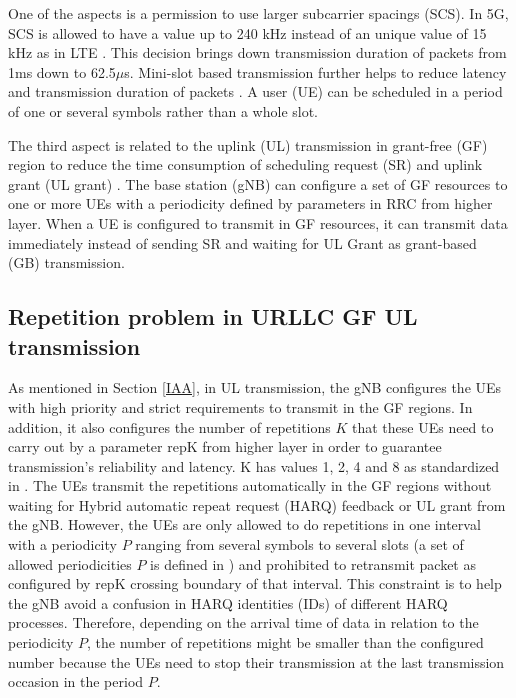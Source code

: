 \documentclass[conference]{IEEEtran}
\begin{document}
One of the aspects is a permission to use larger subcarrier spacings (SCS). In 5G, SCS is allowed to have a value up to 240 kHz instead of an unique value of 15 kHz as in LTE \cite{ad2}. This decision brings down transmission duration of packets from 1ms down to 62.5$\mu$s. Mini-slot based transmission further helps to reduce latency and transmission duration of packets \cite{ad3}. A user (UE) can be scheduled in a period of one or several symbols rather than a whole slot. 

The third aspect is related to the uplink (UL) transmission in grant-free (GF) region to reduce the time consumption of scheduling request (SR) and uplink grant (UL grant) \cite{ad4}. The base station (gNB) can configure a set of GF resources to one or more UEs with a periodicity defined by parameters in RRC from higher layer. When a UE is configured to transmit in GF resources, it can transmit data immediately instead of sending SR and waiting for UL Grant as grant-based (GB) transmission.

\subsection{Repetition problem in URLLC GF UL transmission}\label{IBB}
As mentioned in Section \ref{IAA}, in UL transmission, the gNB configures the UEs with high priority and strict requirements to transmit in the GF regions. In addition, it also configures the number of repetitions $K$ that these UEs need to carry out by a parameter repK from higher layer in order to guarantee transmission’s reliability and latency. K has values 1, 2, 4 and 8 as standardized in \cite{ad5}. The UEs transmit the repetitions automatically in the GF regions without waiting for Hybrid automatic repeat request (HARQ) feedback or UL grant from the gNB. However, the UEs are only allowed to do repetitions in one interval with a periodicity $P$ ranging from several symbols to several slots (a set of allowed periodicities $P$ is defined in \cite{ad5}) and prohibited to retransmit packet as configured by repK crossing boundary of that interval. This constraint is to help the gNB avoid a confusion in HARQ identities (IDs) of different HARQ processes. Therefore, depending on the arrival time of data in relation to the periodicity $P$, the number of repetitions might be smaller than the configured number because the UEs need to stop their transmission at the last transmission occasion in the period $P$.
\end{document}
